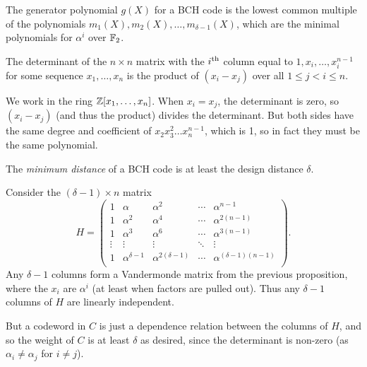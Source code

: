 \documentclass{article}
\begin{document}
\begin{corollary}
    The generator polynomial $g(X)$ for a BCH code is the lowest common multiple of the polynomials $m_1(X), m_2(X), \dots, m_{\delta-1}(X)$, which are the minimal polynomials for $\alpha^i$ over $\mathbb{F}_2$.
\end{corollary}

\begin{proposition}
    The determinant of the $n \times n$ matrix with the $i^{\text{th}}$ column equal to $1, x_i, \dots, x_i^{n-1}$ for some sequence $x_1, \dots, x_n$ is the product of $(x_i - x_j)$ over all $1 \leq j < i \leq n$.
\end{proposition}

\begin{prf}
    We work in the ring $\mathbb{Z}[x_1, \dots, x_n]$. When $x_i = x_j$, the determinant is zero, so $(x_i - x_j)$ (and thus the product) divides the determinant. But both sides have the same degree and coefficient of $x_2x_3^2\dots x_n^{n-1}$, which is 1, so in fact they must be the same polynomial.
\end{prf}

\begin{theorem}
	\label{design-distance-theorem}
    The \textit{minimum distance} of a BCH code is at least the design distance $\delta$.
\end{theorem}

\begin{prf}
    Consider the $(\delta-1) \times n$ matrix
    \[
	H = \begin{pmatrix}
		1 & \alpha & \alpha^2 & \cdots & \alpha^{n-1} \\
		1 & \alpha^2 & \alpha^4 & \cdots & \alpha^{2(n-1)} \\
		1 & \alpha^3 & \alpha^6 & \cdots & \alpha^{3(n-1)} \\
		\vdots & \vdots & \vdots & \ddots & \vdots \\
		1 & \alpha^{\delta-1} & \alpha^{2(\delta-1)} & \cdots & \alpha^{(\delta-1)(n-1)} \\
	\end{pmatrix}.
	\]
	Any $\delta-1$ columns form a Vandermonde matrix from the previous proposition, where the $x_i$ are $\alpha^i$ (at least when factors are pulled out). Thus any $\delta-1$ columns of $H$ are linearly independent.
	
	But a codeword in $C$ is just a dependence relation between the columns of $H$, and so the weight of $C$ is at least $\delta$ as desired, since the determinant is non-zero (as $\alpha_i \neq \alpha_j$ for $i \neq j$).
\end{prf}
\end{document}
